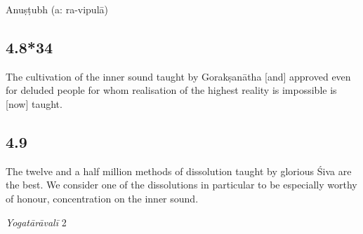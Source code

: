 \begin{ekdosis}



\begin{metre}[hp04_008_33]
Anuṣṭubh (a: ra-vipulā)
\end{metre}

\subsection*{4.8*34}
\begin{translation}[hp04_008_34]
The cultivation of the inner sound taught by Gorakṣanātha [and] approved even for deluded people for whom realisation of the highest reality is impossible is [now] taught.
\end{translation} %





\subsection*{4.9}
\begin{translation}[hp04_009]
The twelve and a half million methods of dissolution taught by glorious Śiva are the best. We consider one of the dissolutions in particular to be especially worthy of honour, concentration on the inner sound.
\end{translation}

\begin{sources}[hp04_009]
\emph{Yogatārāvalī} 2
\begin{versinnote}
\end{versinnote}
\end{sources}


\end{ekdosis}
